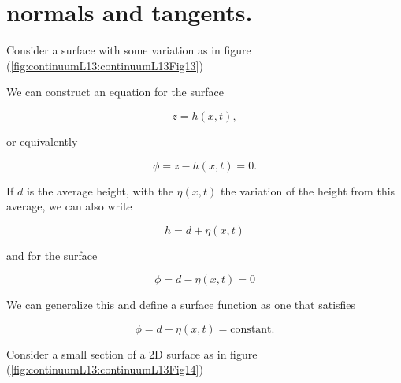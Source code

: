 \section{normals and tangents.}


Consider a surface with some variation as in figure (\ref{fig:continuumL13:continuumL13Fig13})


We can construct an equation for the surface

\begin{equation}\label{eqn:continuumL13:160}
z = h(x, t),
\end{equation}

or equivalently

\begin{equation}\label{eqn:continuumL13:180}
\phi = z - h(x, t) = 0.
\end{equation}

If $d$ is the average height, with the $\eta(x,t)$ the variation of the height from this average, we can also write

\begin{equation}\label{eqn:continuumL13:200}
h = d + \eta(x, t)
\end{equation}

and for the surface

\begin{equation}\label{eqn:continuumL13:220}
\phi = d - \eta(x, t) = 0
\end{equation}

We can generalize this and define a surface function as one that satisfies

\begin{equation}\label{eqn:continuumL13:220b}
\phi = d - \eta(x, t) = \text{constant}.
\end{equation}

Consider a small section of a 2D surface as in figure (\ref{fig:continuumL13:continuumL13Fig14})

